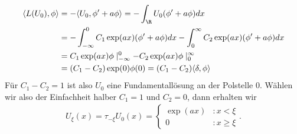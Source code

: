 \begin{solution}
\begin{enumerate}[label = (\roman*)]
  \begin{align*}
    \langle L(U_0), \phi \rangle
    &= -\langle U_0, \phi^{\prime} + a\phi \rangle
  = -\int_{\R}U_0(\phi^{\prime} + a\phi)dx \\
  &= -\int_{-\infty}^0C_1\exp(ax)(\phi^{\prime} + a\phi)dx
  -\int_0^{\infty}C_2\exp(ax)(\phi^{\prime} + a\phi)dx \\
  &= C_1\exp(ax)\phi\mid_{-\infty}^0 - C_2\exp(ax)\phi\mid_{0}^{\infty}\\
  &= (C_1-C_2)\exp(0)\phi(0) = (C_1 - C_2)\langle \delta, \phi \rangle
  \end{align*}
  Für $C_1 - C_2 = 1$ ist also $U_0$ eine Fundamentallösung
  an der Polstelle $0$. Wählen wir also der Einfachheit halber $C_1 = 1$ und $C_2 = 0$, dann erhalten wir
  \begin{align*}
    U_{\xi}(x) = \tau_{-\xi}U_0(x) =
    \begin{cases}
      \exp(ax) &: x < \xi \\
      0 &: x \geq \xi
    \end{cases}.
  \end{align*}
\end{enumerate}


\end{solution}

